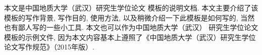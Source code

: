 
本文是中国地质大学（武汉）研究生学位论文 \LaTeXe{} 模板的说明文档. 本文主要介绍了该模板的写作背景,
写作目的, 使用方法, 以及稍微介绍一下此模板是如何写的, 当然也有鄙人写的一些小工具.
本文也可以作为中国地质大学（武汉）
研究生学位论文 \LaTeXe{} 模板的示例文件,
因为本文内容基本上遵照了《中国地质大学（武汉）研究生学位论文写作规范》（2015年版）.

\endinput
